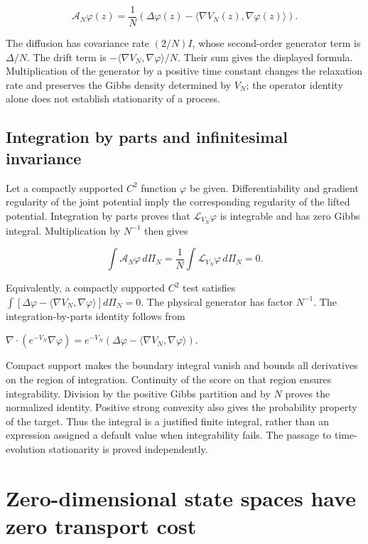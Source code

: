 \documentclass[11pt,a4paper]{article}
\begin{document}
\[\mathcal A_N\varphi(z)=\frac1N\left(\Delta\varphi(z)-\langle\nabla V_N(z),\nabla\varphi(z)\rangle\right).\]

The diffusion has covariance rate \((2/N)I\), whose second-order generator term is \(\Delta/N\). The drift term is \(-\langle\nabla V_N,\nabla\varphi\rangle/N\). Their sum gives the displayed formula. Multiplication of the generator by a positive time constant changes the relaxation rate and preserves the Gibbs density determined by \(V_N\); the operator identity alone does not establish stationarity of a process.



\subsection{\texorpdfstring{Integration by parts and infinitesimal invariance}{Integration by parts and infinitesimal invariance}}


Let a compactly supported \(C^2\) function \(\varphi\) be given. Differentiability and gradient regularity of the joint potential imply the corresponding regularity of the lifted potential. Integration by parts proves that \(\mathcal L_{V_N}\varphi\) is integrable and has zero Gibbs integral. Multiplication by \(N^{-1}\) then gives

\[\int\mathcal A_N\varphi\,d\Pi_N=\frac1N\int\mathcal L_{V_N}\varphi\,d\Pi_N=0.\]

Equivalently, a compactly supported \(C^2\) test satisfies \(\int[\Delta\varphi-\langle\nabla V_N,\nabla\varphi\rangle]d\Pi_N=0\). The physical generator has factor \(N^{-1}\). The integration-by-parts identity follows from



\(\nabla\!\cdot(e^{-V_N}\nabla\varphi)=e^{-V_N}(\Delta\varphi-\langle\nabla V_N,\nabla\varphi\rangle)\).



Compact support makes the boundary integral vanish and bounds all derivatives on the region of integration. Continuity of the score on that region ensures integrability. Division by the positive Gibbs partition and by \(N\) proves the normalized identity. Positive strong convexity also gives the probability property of the target. Thus the integral is a justified finite integral, rather than an expression assigned a default value when integrability fails. The passage to time-evolution stationarity is proved independently.



\section{\texorpdfstring{Zero-dimensional state spaces have zero transport cost}{Zero-dimensional state spaces have zero transport cost}}
\end{document}
